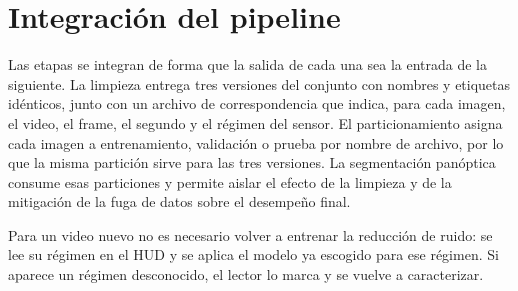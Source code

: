 \section{Integración del pipeline}
\label{sec:integracion}
Las etapas se integran de forma que la salida de cada una sea la entrada de la siguiente. La limpieza entrega tres versiones del conjunto con nombres y etiquetas idénticos, junto con un archivo de correspondencia que indica, para cada imagen, el video, el frame, el segundo y el régimen del sensor. El particionamiento asigna cada imagen a entrenamiento, validación o prueba por nombre de archivo, por lo que la misma partición sirve para las tres versiones. La segmentación panóptica consume esas particiones y permite aislar el efecto de la limpieza y de la mitigación de la fuga de datos sobre el desempeño final.

Para un video nuevo no es necesario volver a entrenar la reducción de ruido: se lee su régimen en el HUD y se aplica el modelo ya escogido para ese régimen. Si aparece un régimen desconocido, el lector lo marca y se vuelve a caracterizar.

